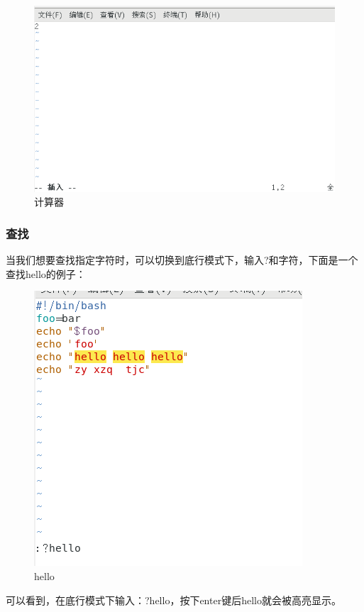 \documentclass{ctexart}
\begin{document}
	\begin{figure}[H]
		\centering
		\includegraphics[scale=0.5]{2.39}
		\caption{计算器}
	\end{figure}
	
	\subsubsection{查找}
	当我们想要查找指定字符时，可以切换到底行模式下，输入?和字符，下面是一个查找hello的例子：
	
	\begin{figure}[H]
		\centering
		\includegraphics[scale=0.5]{2.40}
		\caption{hello}
	\end{figure}
	
	可以看到，在底行模式下输入：?hello，按下enter键后hello就会被高亮显示。
	
\end{document}
